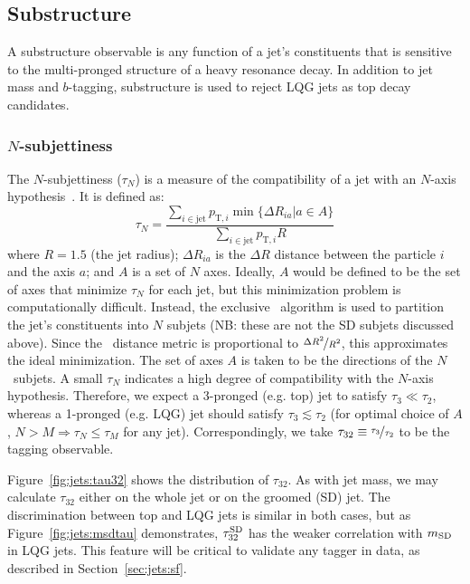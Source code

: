\subsection{Substructure}

A substructure observable is any function of a jet's constituents that is sensitive to the multi-pronged structure of a heavy resonance decay. 
In addition to jet mass and $b$-tagging, substructure is used to reject LQG jets as top decay candidates. 

\subsubsection{$N$-subjettiness}

The $N$-subjettiness ($\tau_N$) is a measure of the compatibility of a jet with an $N$-axis hypothesis~\needcite.
It is defined as:
\begin{equation}
    \tau_N = \frac{\sum_{i\in\mathrm{jet}} p_{\mathrm{T},i} \min\{\Delta R_{ia} | a\in A\}}{\sum_{i\in\mathrm{jet}} p_{\mathrm{T},i} R}
\end{equation}
where $R=1.5$ (the jet radius); $\Delta R_{ia}$ is the $\Delta R$ distance between the particle $i$ and the axis $a$; and $A$ is a set of $N$ axes. 
Ideally, $A$ would be defined to be the set of axes that minimize $\tau_N$ for each jet, but this minimization problem is computationally difficult.  
Instead, the exclusive \kt~algorithm is used to partition the jet's constituents into $N$ subjets (NB: these are not the SD subjets discussed above).
Since the \kt~distance metric is proportional to $\nicefrac{\Delta R^2}{R^2}$, this approximates the ideal minimization.
The set of axes $A$ is taken to be the directions of the $N$ \kt~subjets. 
A small $\tau_N$ indicates a high degree of compatibility with the $N$-axis hypothesis.
Therefore, we expect a 3-pronged (e.g. top) jet to satisfy $\tau_3 \ll \tau_2$, whereas a 1-pronged (e.g. LQG) jet should satisfy $\tau_3 \lesssim \tau_2$ (for optimal choice of $A$, $N>M \Rightarrow \tau_{N} \leq \tau_{M}$ for any jet). 
Correspondingly, we take $\tau_{32} \equiv \nicefrac{\tau_3}{\tau_2}$ to be the tagging observable. 

Figure~\ref{fig:jets:tau32} shows the distribution of $\tau_{32}$.
As with jet mass, we may calculate $\tau_{32}$ either on the whole jet or on the groomed (SD) jet.
The discrimination between top and LQG jets is similar in both cases, but as Figure~\ref{fig:jets:msdtau} demonstrates, $\tau_{32}^{\mathrm{SD}}$ has the weaker correlation with $m_{\mathrm{SD}}$ in LQG jets. 
This feature will be critical to validate any tagger in data, as described in Section~\ref{sec:jets:sf}.

